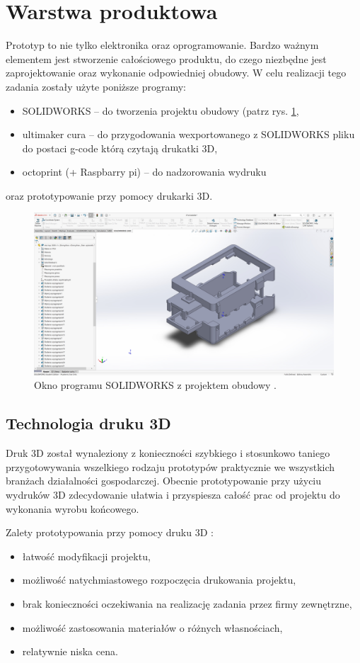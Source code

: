 \documentclass[a4paper,12pt,reqno]{article}
\begin{document}
\newpage
\section{Warstwa produktowa} \label{section:warstwa_produkcyjna} %
Prototyp to nie tylko elektronika oraz oprogramowanie. Bardzo ważnym elementem jest stworzenie całościowego produktu, do czego niezbędne jest zaprojektowanie oraz wykonanie odpowiedniej obudowy. W celu realizacji tego zadania zostały użyte poniższe programy:
\begin{itemize}
\item SOLIDWORKS – do tworzenia projektu obudowy (patrz rys. \ref{okno_solidworks},
\item ultimaker cura – do przygodowania wexportowanego z SOLIDWORKS pliku do postaci g-code którą czytają drukatki 3D,
\item octoprint (+ Raspbarry pi) – do nadzorowania wydruku
\end{itemize}
oraz prototypowanie przy pomocy drukarki 3D.
\begin{figure}[H]%
\centering
\includegraphics[width=0.8\columnwidth]{imgs/solidworks.jpg}
\caption{Okno programu SOLIDWORKS z projektem obudowy \cite{img_me}. \label{okno_solidworks}}
\quad
\end{figure}
\subsection{Technologia druku 3D}
Druk 3D został wynaleziony z konieczności szybkiego i stosunkowo taniego przygotowywania wszelkiego rodzaju prototypów praktycznie we wszystkich branżach działalności gospodarczej. 
Obecnie prototypowanie przy użyciu wydruków 3D zdecydowanie ułatwia i przyspiesza całość prac od projektu do wykonania wyrobu końcowego.

Zalety prototypowania przy pomocy druku 3D \cite{prototyp3dzalety}:
\begin{itemize}
\item łatwość modyfikacji projektu,
\item możliwość natychmiastowego rozpoczęcia drukowania projektu,
\item brak konieczności oczekiwania na realizację zadania przez firmy zewnętrzne,
\item możliwość zastosowania materiałów o różnych własnościach,
\item relatywnie niska cena.
\end{itemize}
\end{document}
